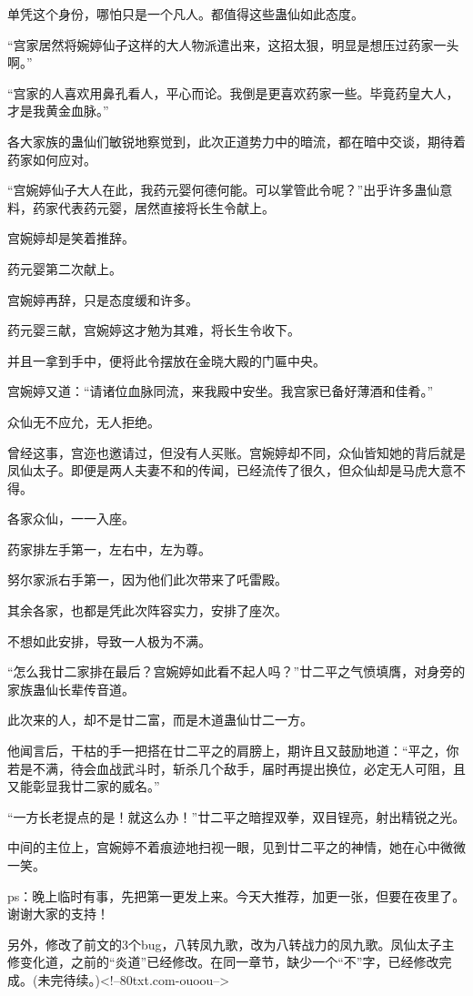 \begin{this_body}
单凭这个身份，哪怕只是一个凡人。都值得这些蛊仙如此态度。

“宫家居然将婉婷仙子这样的大人物派遣出来，这招太狠，明显是想压过药家一头啊。”

“宫家的人喜欢用鼻孔看人，平心而论。我倒是更喜欢药家一些。毕竟药皇大人，才是我黄金血脉。”

各大家族的蛊仙们敏锐地察觉到，此次正道势力中的暗流，都在暗中交谈，期待着药家如何应对。

“宫婉婷仙子大人在此，我药元婴何德何能。可以掌管此令呢？”出乎许多蛊仙意料，药家代表药元婴，居然直接将长生令献上。

宫婉婷却是笑着推辞。

药元婴第二次献上。

宫婉婷再辞，只是态度缓和许多。

药元婴三献，宫婉婷这才勉为其难，将长生令收下。

并且一拿到手中，便将此令摆放在金晓大殿的门匾中央。

宫婉婷又道：“请诸位血脉同流，来我殿中安坐。我宫家已备好薄酒和佳肴。”

众仙无不应允，无人拒绝。

曾经这事，宫迩也邀请过，但没有人买账。宫婉婷却不同，众仙皆知她的背后就是凤仙太子。即便是两人夫妻不和的传闻，已经流传了很久，但众仙却是马虎大意不得。

各家众仙，一一入座。

药家排左手第一，左右中，左为尊。

努尔家派右手第一，因为他们此次带来了吒雷殿。

其余各家，也都是凭此次阵容实力，安排了座次。

不想如此安排，导致一人极为不满。

“怎么我廿二家排在最后？宫婉婷如此看不起人吗？”廿二平之气愤填膺，对身旁的家族蛊仙长辈传音道。

此次来的人，却不是廿二富，而是木道蛊仙廿二一方。

他闻言后，干枯的手一把搭在廿二平之的肩膀上，期许且又鼓励地道：“平之，你若是不满，待会血战武斗时，斩杀几个敌手，届时再提出换位，必定无人可阻，且又能彰显我廿二家的威名。”

“一方长老提点的是！就这么办！”廿二平之暗捏双拳，双目锃亮，射出精锐之光。

中间的主位上，宫婉婷不着痕迹地扫视一眼，见到廿二平之的神情，她在心中微微一笑。

ps：晚上临时有事，先把第一更发上来。今天大推荐，加更一张，但要在夜里了。谢谢大家的支持！

另外，修改了前文的3个bug，八转凤九歌，改为八转战力的凤九歌。凤仙太子主修变化道，之前的“炎道”已经修改。在同一章节，缺少一个“不”字，已经修改完成。(未完待续。)<!--80txt.com-ouoou-->

\end{this_body}

